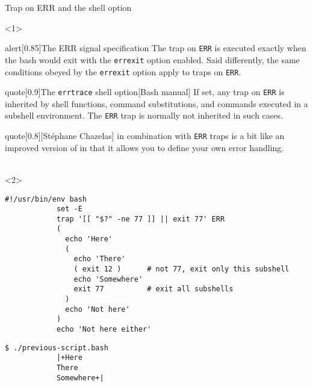 \begin{frame}[fragile]{Trap on ERR and the  shell option}
    \vspace{-1mm}
    \begin{onlyenv}<1>
        \begin{varblock}{alert}[0.85\textwidth]{The ERR signal specification}
            The trap on \texttt{ERR} is executed exactly when the bash would exit with the \texttt{errexit} option enabled.
            Said differently, the same conditions obeyed by the \texttt{errexit} option apply to traps on \texttt{ERR}.
        \end{varblock}
        \begin{varblock}{quote}[0.9\textwidth]{The \;\texttt{errtrace}\; shell option}[Bash manual]
            If set, any trap on \texttt{ERR} is inherited by shell functions, command substitutions, and commands executed in a subshell environment.
            The \texttt{ERR} trap is normally not inherited in such cases.
        \end{varblock}
        \begin{varblock}{quote}[0.8\textwidth]{}[St\'ephane Chazelas]
             in combination with \texttt{ERR} traps is a bit like an improved version of  in that it allows you to define your own error handling.\\[-0.5em] ~
        \end{varblock}
    \end{onlyenv}
    \begin{onlyenv}<2>
        \begin{lstlisting}[style=myBash, aboveskip=2mm]
            #!/usr/bin/env bash
            set -E
            trap '[[ "$?" -ne 77 ]] || exit 77' ERR
            (
              echo 'Here'
              (
                echo 'There'
                ( exit 12 )      # not 77, exit only this subshell
                echo 'Somewhere'
                exit 77          # exit all subshells
              )
              echo 'Not here'
            )
            echo 'Not here either'
        \end{lstlisting}
        \begin{lstlisting}[style=myBash, aboveskip=2mm, numbers=none]
            $ ./previous-script.bash
            |+Here
            There
            Somewhere+|
        \end{lstlisting}
    \end{onlyenv}
\end{frame}
